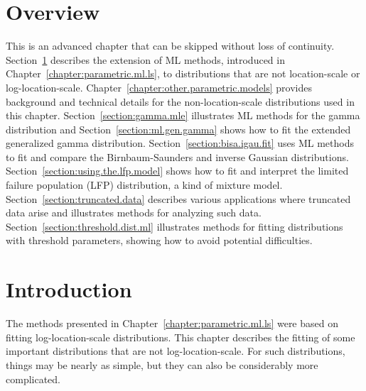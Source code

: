 \section*{Overview}
This is an advanced chapter that can be skipped without loss of
continuity.  Section~\ref{section:other.dist.ml} describes the
extension of ML methods, introduced in
Chapter~\ref{chapter:parametric.ml.ls}, to distributions that are
not location-scale or log-location-scale.
Chapter~\ref{chapter:other.parametric.models} provides background
and technical details for the non-location-scale distributions used
in this chapter. Section~\ref{section:gamma.mle} illustrates ML
methods for the gamma distribution and
Section~\ref{section:ml.gen.gamma} shows how to fit the extended
generalized gamma distribution.  Section~\ref{section:bisa.igau.fit}
uses ML methods to fit and compare the Birnbaum-Saunders and inverse
Gaussian distributions.  Section~\ref{section:using.the.lfp.model}
shows how to fit and interpret the limited failure population (LFP)
distribution, a kind of mixture model.
Section~\ref{section:truncated.data} describes various applications
where truncated data arise and illustrates methods for analyzing
such data.  Section~\ref{section:threshold.dist.ml} illustrates
methods for fitting distributions with threshold parameters, showing
how to avoid potential difficulties.


\section{Introduction}
\label{section:other.dist.ml}

The methods presented in Chapter~\ref{chapter:parametric.ml.ls} were
based on fitting log-location-scale distributions. This chapter
describes the fitting of some important distributions that are not
log-location-scale.  For such distributions, things may be nearly as
simple, but they can also be considerably more complicated.

